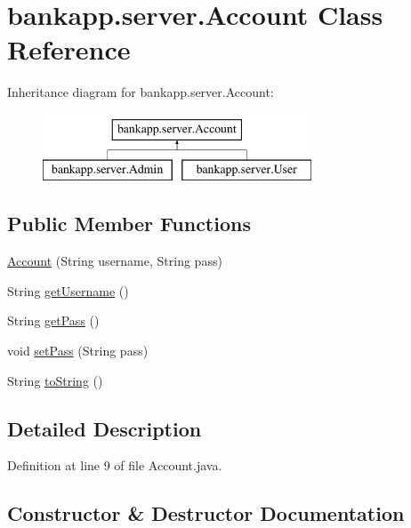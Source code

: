 \hypertarget{classbankapp_1_1server_1_1_account}{}\section{bankapp.\+server.\+Account Class Reference}
\label{classbankapp_1_1server_1_1_account}
Inheritance diagram for bankapp.\+server.\+Account\+:\begin{figure}[H]
\begin{center}
\leavevmode
\includegraphics[height=2.000000cm]{classbankapp_1_1server_1_1_account}
\end{center}
\end{figure}
\subsection*{Public Member Functions}
\begin{DoxyCompactItemize}
\item 
\hyperlink{classbankapp_1_1server_1_1_account_a778b65b96a332ab3f7b2b2ad7da626a9}{Account} (String username, String pass)
\item 
String \hyperlink{classbankapp_1_1server_1_1_account_af1680fd62898dcc86a2e76c1f326f7d0}{get\+Username} ()
\item 
String \hyperlink{classbankapp_1_1server_1_1_account_a10506c227d9d68f13bc1b177c86c6da0}{get\+Pass} ()
\item 
void \hyperlink{classbankapp_1_1server_1_1_account_ab6a8bbb30450a1090fa9ee8770b25148}{set\+Pass} (String pass)
\item 
String \hyperlink{classbankapp_1_1server_1_1_account_af9ce01fe2afb9e196b9ea0ceb51eb3ae}{to\+String} ()
\end{DoxyCompactItemize}


\subsection{Detailed Description}


Definition at line 9 of file Account.\+java.



\subsection{Constructor \& Destructor Documentation}
\mbox{\label{classbankapp_1_1server_1_1_account_a778b65b96a332ab3f7b2b2ad7da626a9}} 
